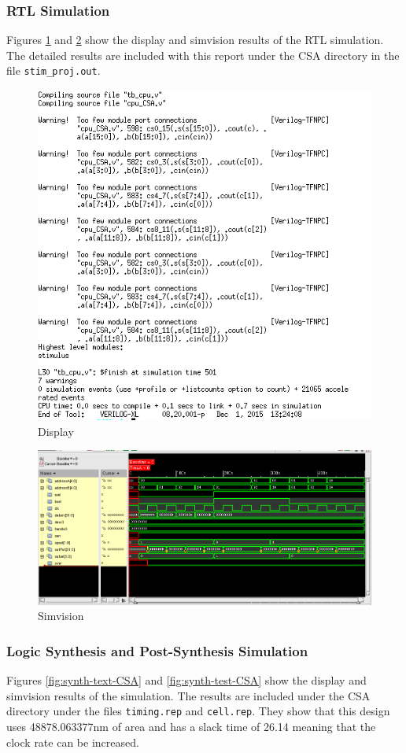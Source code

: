 \documentclass[12pt]{article}
\begin{document}
\subsubsection{RTL Simulation}
Figures \ref{fig:RTL-text-CSA} and \ref{fig:CSA-test} show the display and simvision results of the RTL simulation. The detailed results are included with this report under the CSA directory in the file \texttt{stim\_proj.out}.
\begin{figure}[H]
	\centering
	\includegraphics[width=.7\linewidth]{../CSA/RTL-text}
	\caption{Display}
	\label{fig:RTL-text-CSA}
\end{figure}


\begin{figure}[H]
	\centering
	\includegraphics[width=\linewidth]{../CSA/CSA-test}
	\caption{Simvision}
	\label{fig:CSA-test}
\end{figure}
\subsubsection{Logic Synthesis and Post-Synthesis Simulation}
Figures \ref{fig:synth-text-CSA} and \ref{fig:synth-test-CSA} show the display and simvision results of the simulation. The results are included under the CSA directory under the files \texttt{timing.rep} and \texttt{cell.rep}. They show that this design uses 48878.063377nm of area and has a slack time of 26.14 meaning that the clock rate can be increased.
\end{document}
